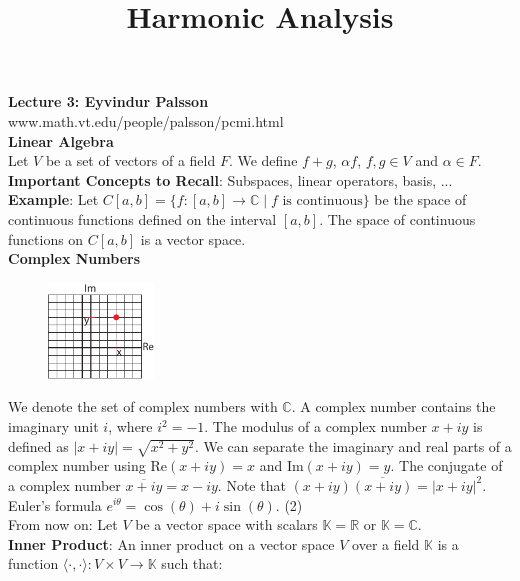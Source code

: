 \documentclass[12pt]{article}
\title{Harmonic Analysis}
\begin{document}
\noindent \textbf{Lecture 3: Eyvindur Palsson} \\
\noindent www.math.vt.edu/people/palsson/pcmi.html \\

\noindent \textbf{Linear Algebra} \\
\noindent Let $V$ be a set of vectors of a field $F$. We define $f+g$, $\alpha f$, $f,g \in V$ and $\alpha \in F$.  \\

\noindent \textbf{Important Concepts to Recall}: Subspaces, linear operators, basis, ... \\

\noindent \textbf{Example}: Let $C[a,b] = \{f: [a,b]\rightarrow \mathbb{C} \mid f \text{ is continuous}\}$ be the space of continuous functions defined on the interval $[a,b]$. The space of continuous functions on $C[a,b]$ is a vector space. \\

\noindent \textbf{Complex Numbers} \\

\begin{figure}[H]
\centering
\includegraphics[width=0.25\textwidth]{ComplexNumberCoordinates.pdf}
\end{figure}


\noindent We denote the set of complex numbers with $\mathbb{C}$. A complex number contains the imaginary unit $i$, where $i^2=-1$. The modulus of a complex number $x+iy$ is defined as $\vert x + iy \vert =\sqrt{x^2+y^2}$. We can separate the imaginary and real parts of a complex number using $\text{Re}(x+iy)=x$ and $\text{Im}(x+iy)=y$. The conjugate of a complex number $\overline{x+iy} = x-iy$. Note that $(x+iy)\overline{(x+iy)} = \vert x+iy\vert^2$. Euler's formula $e^{i\theta} = \cos (\theta) + i \sin (\theta)$. 
(2) \\

\noindent From now on: Let $V$ be a vector space with scalars $\mathbb{K}=\mathbb{R}$ or $\mathbb{K} = \mathbb{C}$. \\

\noindent \textbf{Inner Product}: An inner product on a vector space $V$ over a field $\mathbb{K}$ is a function $\langle \cdot , \cdot \rangle: V \times V \rightarrow \mathbb{K}$ such that:
\end{document}
